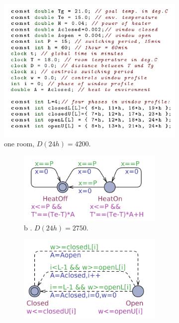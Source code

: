     \begin{figure}[!htb]
      \begin{subfigure}{0.60\textwidth}
        \centering
        \includegraphics[width=\linewidth]{images/oneroom1.png}
        \caption{one room, $D(24h)=4200$.} \label{fig:1a}
      \end{subfigure}
      \hspace*{\fill}
      \begin{subfigure}{0.35\textwidth}
          \begin{subfigure}{\textwidth}
            \includegraphics[width=\linewidth]{images/heatingmodes.png}
            \caption{b . $D(24h)=2750$.} \label{fig:1b}
          \end{subfigure}
          \begin{subfigure}{\textwidth}
            \includegraphics[width=\linewidth]{images/windowprofile.png}

\end{subfigure}
\end{subfigure}
\end{figure}
